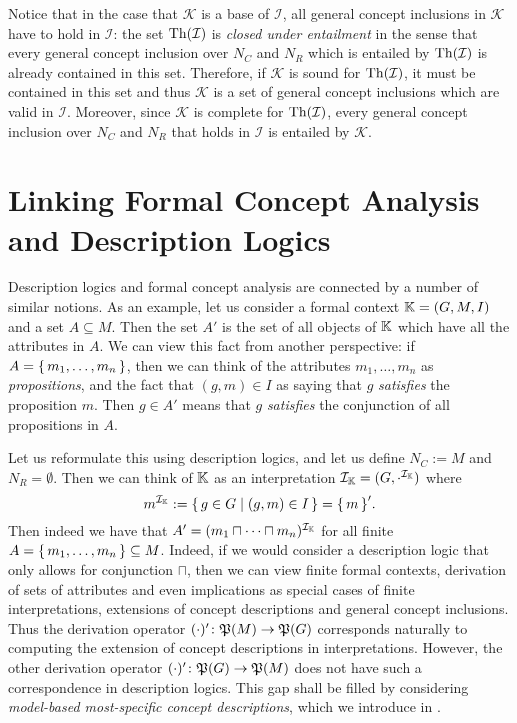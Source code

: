Notice that in the case that $\mathcal{K}$ is a base of $\mathcal{I}$, all general concept
inclusions in $\mathcal{K}$ have to hold in $\mathcal{I}$: the set $\operatorname{Th}(\mathcal{I})$ is
\emph{closed under entailment} in the sense that every \ELgfpbot general concept inclusion
over $N_C$ and $N_R$ which is entailed by $\operatorname{Th}(\mathcal{I})$ is already contained in this
set.  Therefore, if $\mathcal{K}$ is sound for $\operatorname{Th}(\mathcal{I})$, it must be contained in
this set and thus $\mathcal{K}$ is a set of general concept inclusions which are valid in
$\mathcal{I}$.  Moreover, since $\mathcal{K}$ is complete for $\operatorname{Th}(\mathcal{I})$, every
\ELgfpbot general concept inclusion over $N_C$ and $N_R$ that holds in $\mathcal{I}$ is
entailed by $\mathcal{K}$.

\section{Linking Formal Concept Analysis and Description Logics}
\label{sec:motivation}

Description logics and formal concept analysis are connected by a number of similar
notions.  As an example, let us consider a formal context ${\mathbb{K}} = (G, M, I)$ and a set
$A \subseteq M$.  Then the set $A'$ is the set of all objects of ${\mathbb{K}}$ which have all
the attributes in $A$.  We can view this fact from another perspective: if $A = {\{\, m_1,
  \dots, m_n \,\}}$, then we can think of the attributes $m_1, \dots, m_n$ as
\emph{propositions}, and the fact that $(g, m) \in I$ as saying that $g$ \emph{satisfies}
the proposition $m$.  Then $g \in A'$ means that $g$ \emph{satisfies} the conjunction of
all propositions in $A$.

Let us reformulate this using description logics, and let us define $N_C := M$ and $N_R =
\emptyset$.  Then we can think of ${\mathbb{K}}$ as an interpretation $\mathcal{I}_{{\mathbb{K}}} =
(G, \cdot^{\mathcal{I}_{{\mathbb{K}}}})$ where
\begin{equation}
  \label{eq:17}
  m^{\mathcal{I}_{{\mathbb{K}}}} := {\{\, g \in G \mid (g, m) \in I \,\}} = {\{\, m \,\}}'.
\end{equation}
Then indeed we have that $A' = (m_1 \sqcap \dots \sqcap m_n)^{\mathcal{I}_{{\mathbb{K}}}}$ for
all finite $A = {\{\, m_1, \dots, m_n \,\}} \subseteq M$.  Indeed, if we would consider a
description logic that only allows for conjunction $\sqcap$, then we can view finite
formal contexts, derivation of sets of attributes and even implications as special cases
of finite interpretations, extensions of concept descriptions and general concept
inclusions.  Thus the derivation operator $(\cdot)' \colon {\ensuremath{\mathfrak{P}(M)}} \to {\ensuremath{\mathfrak{P}(G)}}$
corresponds naturally to computing the extension of concept descriptions in
interpretations.  However, the other derivation operator $(\cdot)' \colon {\ensuremath{\mathfrak{P}(G)}} \to
{\ensuremath{\mathfrak{P}(M)}}$ does not have such a correspondence in description logics.  This gap shall be
filled by considering \emph{model-based most-specific concept descriptions}, which we
introduce in .

